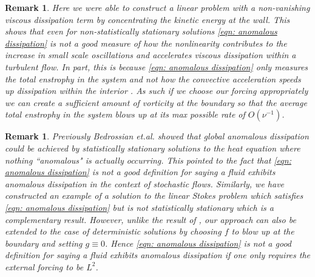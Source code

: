 \documentclass[11pt, reqno]{article}
\newtheorem{remark}[theorem]{Remark}
\begin{document}
\begin{remark}
    Here we were able to construct a linear problem with a non-vanishing viscous dissipation term by concentrating the kinetic energy at the wall.  This shows that even for non-statistically stationary solutions \eqref{eqn: anomalous dissipation} is not a good measure of how the nonlinearity contributes to the increase in small scale oscillations and accelerates viscous dissipation within a turbulent flow. In part, this is because \eqref{eqn: anomalous dissipation} only measures  the total enstrophy in the system and not how the convective acceleration speeds up dissipation within the interior \cite{chen2010study}. As such if we choose our forcing appropriately we can create a sufficient amount of vorticity at the boundary so that the average total enstrophy in the system blows up at its max possible rate of $O(\nu^{-1})$. 
\end{remark}
\begin{remark}
   Previously Bedrossian et.al. \cite{bedrossian2019sufficient} showed that 
   global anomalous dissipation could be achieved by statistically stationary solutions to the heat equation where nothing ``anomalous" is actually occurring. This pointed to the fact that \eqref{eqn: anomalous dissipation} is not a good definition for saying a fluid exhibits anomalous dissipation in the context of stochastic flows. Similarly, we have constructed an example of a solution to the linear Stokes problem which satisfies \eqref{eqn: anomalous dissipation} but is not statistically stationary which is a complementary result. However, unlike the result of \cite{bedrossian2019sufficient}, our approach can also be extended to the case of deterministic solutions by choosing $f$ to blow up at the boundary and setting $g \equiv 0$. Hence \eqref{eqn: anomalous dissipation} is not a good definition for saying a fluid exhibits anomalous dissipation if one only requires the external forcing to be $L^2$. 
\end{remark}
\end{document}
